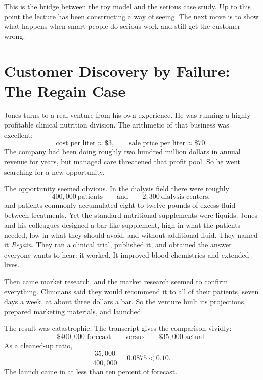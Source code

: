 This is the bridge between the toy model and the serious case study. Up to this point the lecture has been constructing a way of seeing. The next move is to show what happens when smart people do serious work and still get the customer wrong.

\section{Customer Discovery by Failure: The Regain Case}

Jones turns to a real venture from his own experience. He was running a highly profitable clinical nutrition division. The arithmetic of that business was excellent:
\begin{equation}
\text{cost per liter}\approx \$3,
\qquad
\text{sale price per liter}\approx \$70.
\end{equation}
The company had been doing roughly two hundred million dollars in annual revenue for years, but managed care threatened that profit pool. So he went searching for a new opportunity.

The opportunity seemed obvious. In the dialysis field there were roughly
\begin{equation}
400{,}000\ \text{patients}
\qquad \text{and} \qquad
2{,}300\ \text{dialysis centers},
\end{equation}
and patients commonly accumulated eight to twelve pounds of excess fluid between treatments. Yet the standard nutritional supplements were liquids. Jones and his colleagues designed a bar-like supplement, high in what the patients needed, low in what they should avoid, and without additional fluid. They named it \emph{Regain}. They ran a clinical trial, published it, and obtained the answer everyone wants to hear: it worked. It improved blood chemistries and extended lives.

Then came market research, and the market research seemed to confirm everything. Clinicians said they would recommend it to all of their patients, seven days a week, at about three dollars a bar. So the venture built its projections, prepared marketing materials, and launched.

The result was catastrophic. The transcript gives the comparison vividly:
\[
\$400{,}000 \text{ forecast} \qquad \text{versus} \qquad \$35{,}000 \text{ actual.}
\]
As a cleaned-up ratio,
\begin{equation}
\frac{35{,}000}{400{,}000}=0.0875<0.10.
\end{equation}
The launch came in at less than ten percent of forecast.

